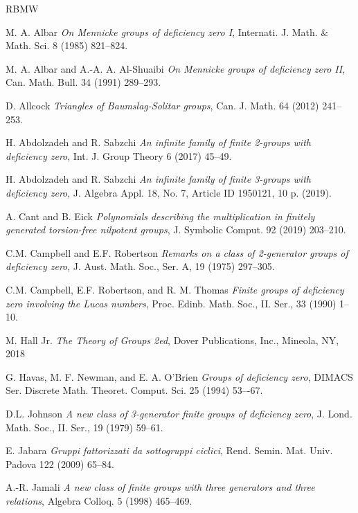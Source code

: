 \documentclass{amsart}
\theoremstyle{definition}
\theoremstyle{remark}
\begin{document}
{\begin{thebibliography}{RBMW}

    \small
		
 M. A. Albar \emph{On Mennicke groups of deficiency zero I},
Internati. J. Math. $\&$ Math. Sci. 8 (1985) 821--824.

 M. A. Albar and A.-A. A. Al-Shuaibi \emph{On Mennicke groups of deficiency zero II},
Can. Math. Bull. 34 (1991) 289--293.


 D. Allcock \emph{Triangles of Baumslag-Solitar groups},
Can. J. Math. 64 (2012) 241--253.

 H. Abdolzadeh and R. Sabzchi
\emph{An infinite family of finite 2-groups with deficiency zero},
Int. J. Group Theory 6 (2017) 45--49.

 H. Abdolzadeh and R. Sabzchi
\emph{An infinite family of finite 3-groups with deficiency zero},
J. Algebra Appl. 18, No. 7, Article ID 1950121, 10 p. (2019).
		
		
 A. Cant and B. Eick \emph{Polynomials describing the multiplication in finitely
              generated torsion-free nilpotent groups}, J. Symbolic Comput. 92 (2019) 203--210.			
							
 C.M. Campbell and E.F. Robertson
\emph{Remarks on a class of 2-generator groups of deficiency zero},
J. Aust. Math. Soc., Ser. A, 19 (1975) 297--305.

 C.M. Campbell, E.F. Robertson, and R. M. Thomas
\emph{Finite groups of deficiency zero involving the Lucas numbers},
Proc. Edinb. Math. Soc., II. Ser., 33  (1990) 1--10.							
		
 M. Hall Jr. \emph{The Theory of Groups 2ed}, Dover Publications, Inc., Mineola, NY, 2018


		
 G. Havas, M. F. Newman, and E. A. O’Brien \emph{Groups of deficiency zero}, DIMACS Ser. Discrete Math. Theoret. Comput. Sci. 25 (1994) 53–-67.

 D.L. Johnson \emph{A new class of 3-generator finite groups of deficiency zero}, 
J. Lond. Math. Soc., II. Ser., 19 (1979) 59--61.

 E. Jabara \emph{Gruppi fattorizzati da sottogruppi ciclici},
Rend. Semin. Mat. Univ. Padova 122 (2009) 65--84.

 A.-R. Jamali \emph{A new class of finite groups with three generators and three relations},
Algebra Colloq. 5 (1998) 465--469.



\end{thebibliography}}
\end{document}
